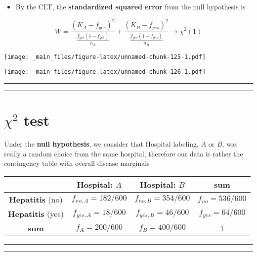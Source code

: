 \documentclass[
]{book}
\providecommand{\tightlist}{%
  \setlength{\itemsep}{0pt}\setlength{\parskip}{0pt}}
\begin{document}
\begin{itemize}
\tightlist
\item
  By the CLT, the \textbf{standardized squared error} from the null hypothesis is
\end{itemize}

\[W= \frac{(\bar{K}_A-f_{yes})^2}{\frac{f_{yes}(1-f_{yes})}{n_A}} + \frac{(\bar{K}_B-f_{yes})^2}{\frac{f_{yes}(1-f_{yes})}{n_B}}\rightarrow \chi^2(1)\]

\texttt{[image: \_main\_files/figure-latex/unnamed-chunk-125-1.pdf]}

\texttt{[image: \_main\_files/figure-latex/unnamed-chunk-126-1.pdf]}

\begin{center}\rule{0.5\linewidth}{0.5pt}\end{center}

\begin{center}\rule{0.5\linewidth}{0.5pt}\end{center}

\hypertarget{chi2-test-1}{%
\section{\texorpdfstring{\(\chi^2\) test}{\textbackslash chi\^{}2 test}}\label{chi2-test-1}}

Under the \textbf{null hypothesis}, we consider that Hospital labeling, \(A\) or \(B\), was really a random choice from the same hospital, therefore our data is rather the contingency table with overall disease marginals

\begin{longtable}[]{@{}cccc@{}}
\toprule
& Hospital: \(A\) & Hospital: \(B\) & sum \\
\midrule
\endhead
\textbf{Hepatitis} (no) & \(f_{no,A}=182/600\) & \(f_{no,B}=354/600\) & \(f_{no}=536/600\) \\
\textbf{Hepatitis} (yes) & \(f_{yes,A}=18/600\) & \(f_{yes,B}=46/600\) & \(f_{yes}=64/600\) \\
\textbf{sum} & \(f_{A}=200/600\) & \(f_{B}=400/600\) & 1 \\
\bottomrule
\end{longtable}

\begin{center}\rule{0.5\linewidth}{0.5pt}\end{center}

\begin{center}\rule{0.5\linewidth}{0.5pt}\end{center}
\end{document}
